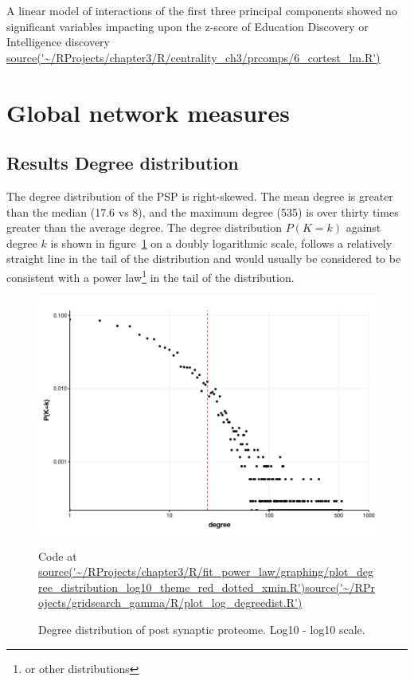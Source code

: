A linear model of interactions of the first three principal components showed no significant variables impacting upon the  z-score of Education Discovery or Intelligence discovery \url{source('~/RProjects/chapter3/R/centrality_ch3/prcomps/6_cortest_lm.R')}

\clearpage
\section{Global network measures}




\subsection{Results Degree distribution}
\label{sec:results degree distribution}
The degree distribution of the PSP is right-skewed. The mean degree is greater than the median (17.6 vs 8), and the maximum degree (535) is over thirty times greater than the average degree. 
 The degree distribution $P(K=k)$ against degree $k$ is shown in figure~\ref{fig:Degree distribution of post synaptic proteome. Log10 - log10 scale1} on a doubly logarithmic scale, follows a relatively straight line in the tail of the distribution and would usually be considered to be consistent with a power law\footnote{or other distributions} in the tail of the distribution.

\begin{figure}
    \includegraphics[width=12cm]{images/chapter3/poweRlaw/Rplot_degree_distribution_log10pktheme.png}
    \caption{Degree distribution of post synaptic proteome. Log10 - log10 scale.}
    \tiny Code at \url{source('~/RProjects/chapter3/R/fit_power_law/graphing/plot_degree_distribution_log10_theme_red_dotted_xmin.R')}\url{source('~/RProjects/gridsearch_gamma/R/plot_log_degreedist.R') }
    \label{fig:Degree distribution of post synaptic proteome. Log10 - log10 scale1}
\end{figure}


